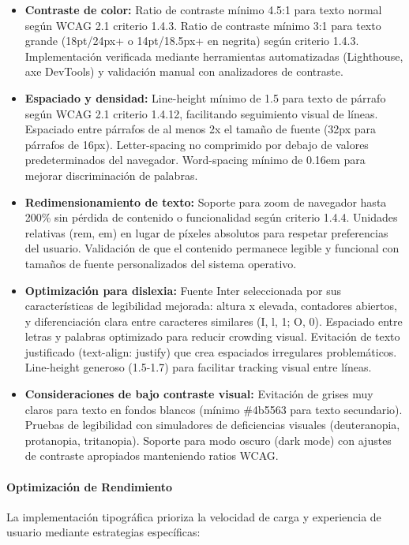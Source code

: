 \documentclass[12pt,a4paper,oneside]{article}
\begin{document}
\begin{itemize}
    \item \textbf{Contraste de color:} Ratio de contraste mínimo 4.5:1 para texto normal según WCAG 2.1 criterio 1.4.3. Ratio de contraste mínimo 3:1 para texto grande (18pt/24px+ o 14pt/18.5px+ en negrita) según criterio 1.4.3. Implementación verificada mediante herramientas automatizadas (Lighthouse, axe DevTools) y validación manual con analizadores de contraste.
    
    \item \textbf{Espaciado y densidad:} Line-height mínimo de 1.5 para texto de párrafo según WCAG 2.1 criterio 1.4.12, facilitando seguimiento visual de líneas. Espaciado entre párrafos de al menos 2x el tamaño de fuente (32px para párrafos de 16px). Letter-spacing no comprimido por debajo de valores predeterminados del navegador. Word-spacing mínimo de 0.16em para mejorar discriminación de palabras.
    
    \item \textbf{Redimensionamiento de texto:} Soporte para zoom de navegador hasta 200\% sin pérdida de contenido o funcionalidad según criterio 1.4.4. Unidades relativas (rem, em) en lugar de píxeles absolutos para respetar preferencias del usuario. Validación de que el contenido permanece legible y funcional con tamaños de fuente personalizados del sistema operativo.
    
    \item \textbf{Optimización para dislexia:} Fuente Inter seleccionada por sus características de legibilidad mejorada: altura x elevada, contadores abiertos, y diferenciación clara entre caracteres similares (I, l, 1; O, 0). Espaciado entre letras y palabras optimizado para reducir crowding visual. Evitación de texto justificado (text-align: justify) que crea espaciados irregulares problemáticos. Line-height generoso (1.5-1.7) para facilitar tracking visual entre líneas.
    
    \item \textbf{Consideraciones de bajo contraste visual:} Evitación de grises muy claros para texto en fondos blancos (mínimo \#4b5563 para texto secundario). Pruebas de legibilidad con simuladores de deficiencias visuales (deuteranopia, protanopia, tritanopia). Soporte para modo oscuro (dark mode) con ajustes de contraste apropiados manteniendo ratios WCAG.
\end{itemize}

\paragraph{Optimización de Rendimiento}
La implementación tipográfica prioriza la velocidad de carga y experiencia de usuario mediante estrategias específicas:
\end{document}

